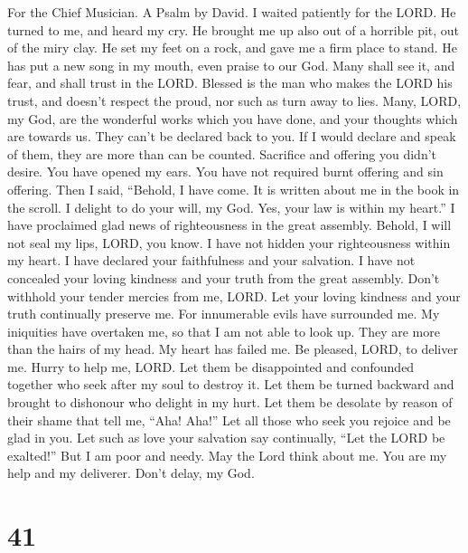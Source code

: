 For the Chief Musician. A Psalm by David.  I waited
patiently for the LORD. He turned to me, and heard my cry.
 He brought me up also out of a horrible pit, out of the
miry clay. He set my feet on a rock, and gave me a firm place to stand.
 He has put a new song in my mouth, even praise to our
God. Many shall see it, and fear, and shall trust in the LORD.
 Blessed is the man who makes the LORD his trust, and
doesn't respect the proud, nor such as turn away to lies. 
Many, LORD, my God, are the wonderful works which you have done, and
your thoughts which are towards us. They can't be declared back to you.
If I would declare and speak of them, they are more than can be counted.
 Sacrifice and offering you didn't desire. You have opened
my ears. You have not required burnt offering and sin offering.
 Then I said, ``Behold, I have come. It is written about
me in the book in the scroll.  I delight to do your will,
my God. Yes, your law is within my heart.''  I have
proclaimed glad news of righteousness in the great assembly. Behold, I
will not seal my lips, LORD, you know.  I have not hidden
your righteousness within my heart. I have declared your faithfulness
and your salvation. I have not concealed your loving kindness and your
truth from the great assembly.  Don't withhold your
tender mercies from me, LORD. Let your loving kindness and your truth
continually preserve me.  For innumerable evils have
surrounded me. My iniquities have overtaken me, so that I am not able to
look up. They are more than the hairs of my head. My heart has failed
me.  Be pleased, LORD, to deliver me. Hurry to help me,
LORD.  Let them be disappointed and confounded together
who seek after my soul to destroy it. Let them be turned backward and
brought to dishonour who delight in my hurt.  Let them be
desolate by reason of their shame that tell me, ``Aha! Aha!''
 Let all those who seek you rejoice and be glad in you.
Let such as love your salvation say continually, ``Let the LORD be
exalted!''  But I am poor and needy. May the Lord think
about me. You are my help and my deliverer. Don't delay, my God.

\hypertarget{section-40}{%
\section{41}\label{section-40}}

